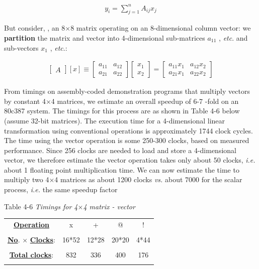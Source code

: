 \begin{align}
    y_{i} = \sum_{j=1}^{n} A_{ij}x_{j}
\end{align}

But consider, \eg, an 8$\times$8 matrix operating on an 8-dimensional column vector: we \textbf{partition} the matrix and vector into 4-dimensional sub-matrices $a_{11}$ , \textit{etc}. and sub-vectors $x_{1}$ , \textit{etc}.:

\begin{align}
    \begin{bmatrix}A\end{bmatrix} [x] \equiv 
    \begin{bmatrix}
      a_{11} & a_{12} \\
      a_{21} & a_{22}
    \end{bmatrix}
    \begin{bmatrix} x_{1} \\ x_{2} \end{bmatrix}
    =
    \begin{bmatrix}
      a_{11}x_{1} & a_{12}x_{2} \\
      a_{21}x_{1} & a_{22}x_{2}
    \end{bmatrix}
\end{align}

From timings on assembly-coded demonstration programs that multiply vectors by constant 4$\times$4 matrices, we estimate an overall speedup of 6-7 -fold on an 80c387 system. The timings for this process are as shown in Table 4-6 below (assume 32-bit  matrices). The execution time for a 4-dimensional linear transformation using conventional operations is approximately 1744 clock cycles. The time using the vector operation is some 250-300 clocks, based on measured performance. Since 256 clocks are needed to load and store a 4-dimensional vector, we therefore estimate the vector operation  takes only about 50 clocks, \textit{i.e.} about 1 floating point multiplication time. We can now estimate the time to multiply two 4$\times$4 matrices as about 1200 clocks \textit{vs.} about 7000 for the scalar process, \textit{i.e.} the same speedup factor

Table 4-6 \textit{Timings for 4$\times$4 matrix - vector}
\begin{center}
    \begin{tabular}{|c c c c c|}
        \hline
        \textbf{\underline{Operation}} & x & + & @ & ! \\
                                       &   &   &   &   \\
        \textbf{\underline{No}}. $\times$ \textbf{\underline{Clocks}}: & 16*52 & 12*28 & 20*20 & 4*44 \\
                                       &   &   &   &   \\
        \textbf{\underline{Total clocks}}: & 832 & 336 & 400 & 176 \\
                                       &   &   &   &   \\
        \hline
    \end{tabular}
\end{center}

